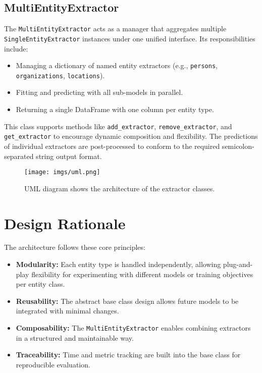 \subsection{MultiEntityExtractor}

The \texttt{MultiEntityExtractor} acts as a manager that aggregates multiple \texttt{SingleEntityExtractor} instances under one unified interface. Its responsibilities include:

\begin{itemize}
  \item Managing a dictionary of named entity extractors (e.g., \texttt{persons}, \texttt{organizations}, \texttt{locations}).
  \item Fitting and predicting with all sub-models in parallel.
  \item Returning a single DataFrame with one column per entity type.
\end{itemize}

This class supports methods like \texttt{add\_extractor}, \texttt{remove\_extractor}, and \texttt{get\_extractor} to encourage dynamic composition and flexibility. The predictions of individual extractors are post-processed to conform to the required semicolon-separated string output format.


\begin{figure}[h]
  \centering
  \texttt{[image: imgs/uml.png]}
  \caption{UML diagram shows the architecture of the extractor classes.}
  \label{fig:uml}
\end{figure}

\section{Design Rationale}

The architecture follows these core principles:

\begin{itemize}
  \item \textbf{Modularity:} Each entity type is handled independently, allowing plug-and-play flexibility for experimenting with different models or training objectives per entity class.
  \item \textbf{Reusability:} The abstract base class design allows future models to be integrated with minimal changes.
  \item \textbf{Composability:} The \texttt{MultiEntityExtractor} enables combining extractors in a structured and maintainable way.
  \item \textbf{Traceability:} Time and metric tracking are built into the base class for reproducible evaluation.
\end{itemize}

